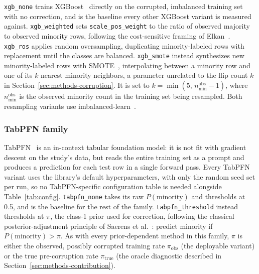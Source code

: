 \texttt{xgb\_none} trains XGBoost~\cite{chen2016xgboost} directly on the
corrupted, imbalanced training set with no correction, and is the baseline
every other XGBoost variant is measured against. \texttt{xgb\_weighted} sets
\texttt{scale\_pos\_weight} to the ratio of observed majority to observed
minority rows, following the cost-sensitive framing of
Elkan~\cite{elkan2001costsensitive}. \texttt{xgb\_ros} applies random
oversampling, duplicating minority-labeled rows with replacement until the
classes are balanced. \texttt{xgb\_smote} instead synthesizes new minority-labeled rows with SMOTE~\cite{chawla2002smote}, interpolating between a minority row and one of its $k$ nearest minority neighbors, a parameter unrelated to the flip count $k$ in Section~\ref{sec:methods-corruption}. It is set to $k = \min(5,\, n_{\min}^{\text{obs}}-1)$, where $n_{\min}^{\text{obs}}$ is the observed minority count in the training set being resampled. Both resampling variants use
imbalanced-learn~\cite{lemaitre2017imbalancedlearn}.

\subsubsection{TabPFN family}

TabPFN~\cite{hollmann2023tabpfn,hollmann2025tabpfnv2} is an in-context tabular
foundation model: it is not fit with gradient descent on the study's data, but
reads the entire training set as a prompt and produces a prediction for each
test row in a single forward pass. Every TabPFN variant uses the library's
default hyperparameters, with only the random seed set per run, so no
TabPFN-specific configuration table is needed alongside
Table~\ref{tab:config}. \texttt{tabpfn\_none} takes its raw
$P(\text{minority})$ and thresholds at 0.5, and is the baseline for the rest
of the family. \texttt{tabpfn\_threshold} instead thresholds at $\pi$, the
class-1 prior used for correction, following the classical
posterior-adjustment principle of Saerens et al.~\cite{saerens2002adjusting}:
predict minority if $P(\text{minority}) > \pi$. As with every prior-dependent
method in this family, $\pi$ is either the observed, possibly corrupted
training rate $\pi_{\text{obs}}$ (the deployable variant) or the true
pre-corruption rate $\pi_{\text{true}}$ (the oracle diagnostic described in
Section~\ref{sec:methods-contribution}).

